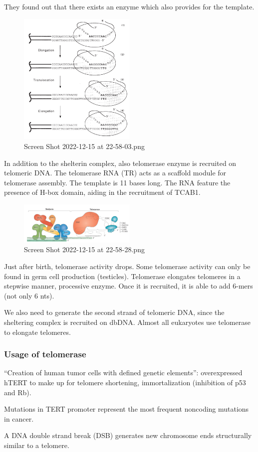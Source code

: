 They found out that there exists an enzyme which also provides for the
template.

\begin{figure}
\centering
\includegraphics[width=0.5\textwidth]{../_resources/Screen_Shot_2022-12-15_at_22-58-03.png}
\caption{Screen Shot 2022-12-15 at 22-58-03.png}
\end{figure}

In addition to the shelterin complex, also telomerase enzyme is
recruited on telomeric DNA. The telomerase RNA (TR) acts as a scaffold
module for telomerase assembly. The template is 11 bases long. The RNA
feature the presence of H-box domain, aiding in the recruitment of
TCAB1.

\begin{figure}
\centering
\includegraphics[width=0.5\textwidth]{../_resources/Screen_Shot_2022-12-15_at_22-58-28.png}
\caption{Screen Shot 2022-12-15 at 22-58-28.png}
\end{figure}


Just after birth, telomerase activity drops. Some telomerase activity
can only be found in germ cell production (testicles). Telomerase
elongates telomeres in a stepwise manner, processive enzyme. Once it is
recruited, it is able to add 6-mers (not only 6 nts).

We also need to generate the second strand of telomeric DNA, since the
sheltering complex is recruited on dbDNA. Almost all eukaryotes use
telomerase to elongate telomeres.

\hypertarget{usage-of-telomerase}{%
\subsubsection{Usage of telomerase}\label{usage-of-telomerase}}

``Creation of human tumor cells with defined genetic elements'':
overexpressed hTERT to make up for telomere shortening, immortalization
(inhibition of p53 and Rb).

Mutations in TERT promoter represent the most frequent noncoding
mutations in cancer.

A DNA double strand break (DSB) generates new chromosome ends
structurally similar to a telomere.

